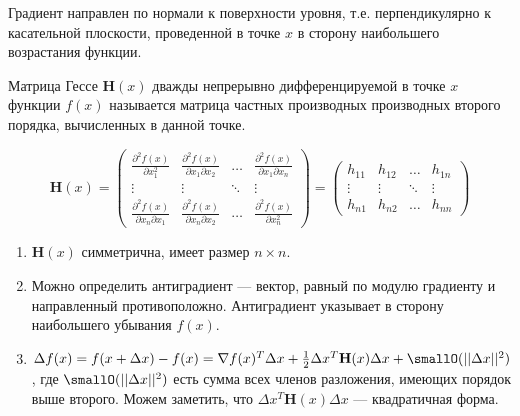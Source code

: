 \begin{remark}
    Градиент направлен по нормали к поверхности уровня, т.е. перпендикулярно к касательной плоскости, проведенной в точке \(x\) в сторону наибольшего возрастания функции.
\end{remark}

\begin{definition}
    Матрица Гессе \(\mathbf H(x)\) дважды непрерывно дифференцируемой в точке \(x\) функции \(f(x)\) называется матрица частных производных производных второго порядка, вычисленных в данной точке.

    \[\mathbf H(x) = \begin{pmatrix}
            \frac{\partial^2 f(x)}{\partial x_1^2}            & \frac{\partial^2 f(x)}{\partial x_1 \partial x_2} & \dots  & \frac{\partial^2 f(x)}{\partial x_1 \partial x_n} \\
            \vdots                                            & \vdots                                            & \ddots & \vdots                                            \\
            \frac{\partial^2 f(x)}{\partial x_n \partial x_1} & \frac{\partial^2 f(x)}{\partial x_n\partial x_2}  & \dots  & \frac{\partial^2 f(x)}{\partial x_n^2}
        \end{pmatrix} = \begin{pmatrix}
            h_{11} & h_{12} & \dots  & h_{1n} \\
            \vdots & \vdots & \ddots & \vdots \\
            h_{n1} & h_{n2} & \dots  & h_{nn}
        \end{pmatrix}  \]
\end{definition}

\begin{enumerate}
    \item \(\mathbf H(x)\) симметрична, имеет размер \(n \times n\).
    \item Можно определить антиградиент --- вектор, равный по модулю градиенту и направленный противоположно. Антиградиент указывает в сторону наибольшего убывания \(f(x)\).
    \item \(\Delta f(x) = f(x + \Delta x) - f(x) = \nabla f(x)^T \Delta x + \frac{1}{2} \Delta x^T \mathbf H(x) \Delta x + \smallO(||\Delta x||^2)\), где \(\smallO(||\Delta x||^2)\) есть сумма всех членов разложения, имеющих порядок выше второго. Можем заметить, что \(\Delta x^T \mathbf H(x) \Delta x\) --- квадратичная форма.
\end{enumerate}

